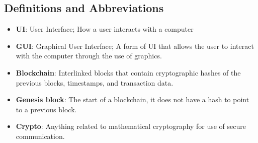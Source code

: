 \subsection{Definitions and Abbreviations}

\begin{itemize}
	\item \textbf{UI}: User Interface; How a user interacts with a computer
	\item \textbf{GUI}: Graphical User Interface; A form of UI that allows 
		  the user to interact with the computer through the use of graphics.
	\item \textbf{Blockchain}: Interlinked blocks that contain cryptographic hashes of the previous blocks,
							   timestamps, and transaction data.
	\item \textbf{Genesis block}: The start of a blockchain, it does not have a hash to point to a
								  previous block. 
 	\item \textbf{Crypto}: Anything related to mathematical cryptography for use of secure communication.
\end{itemize}

